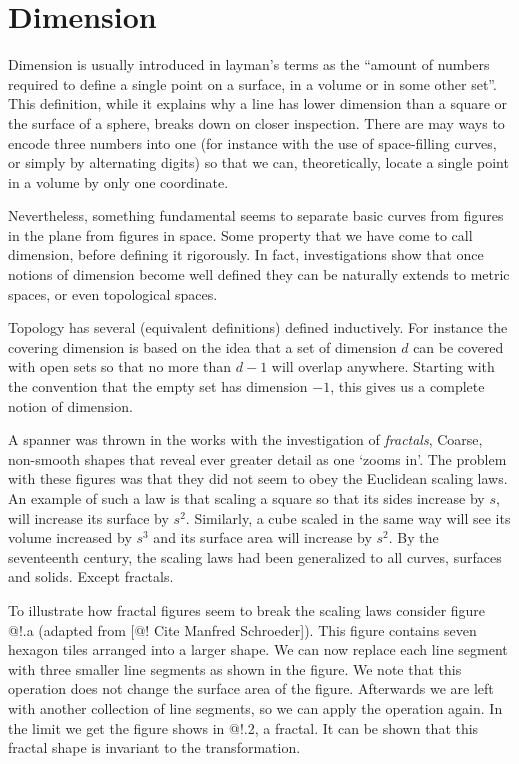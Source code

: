 \documentclass[11pt]{article}
\begin{document}
\section{Dimension}

Dimension is usually introduced in layman's terms as the ``amount of numbers required to define a single point on a surface, in a volume or in some other set''. This definition, while it explains why a line has lower dimension than a square or the surface of a sphere, breaks down on closer inspection. There are may ways to encode three numbers into one (for instance with the use of space-filling curves, or simply by alternating digits) so that we can, theoretically, locate a single point in a volume by only one coordinate. 

Nevertheless, something fundamental seems to separate basic curves from figures in the plane from figures in space. Some property that we have come to call dimension, before defining it rigorously. In fact, investigations show that once notions of dimension become well defined they can be naturally extends to metric spaces, or even topological spaces. 

Topology has several (equivalent definitions) defined inductively. For instance the covering dimension is based on the idea that a set of dimension $d$ can be covered with open sets so that no more than $d-1$ will overlap anywhere. Starting with the convention that the empty set has dimension $-1$, this gives us a complete notion of dimension.

A spanner was thrown in the works with the investigation of \textit{fractals}, Coarse, non-smooth shapes that reveal ever greater detail as one `zooms in'. The problem with these figures was that they did not seem to obey the Euclidean scaling laws. An example of such a law is that scaling a square so that its sides increase by $s$, will increase its surface by $s^2$. Similarly, a cube scaled in the same way will see its volume increased by $s^3$ and its surface area will increase by $s^2$. By the seventeenth century, the scaling laws had been generalized to all curves, surfaces and solids. Except fractals.

To illustrate how fractal figures seem to break the scaling laws consider figure @!.a (adapted from [@! Cite Manfred Schroeder]). This figure contains seven hexagon tiles arranged into a larger shape. We can now replace each line segment with three smaller line segments as shown in the figure. We note that this operation does not change the surface area of the figure. Afterwards we are left with another collection of line segments, so we can apply the operation again. In the limit we get the figure shows in @!.2, a fractal. It can be shown that this fractal shape is invariant to the transformation.
\end{document}
